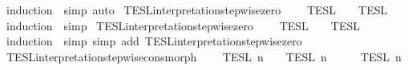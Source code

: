 \begin{isabellebody}
%
\isadelimproof
%
\endisadelimproof
%
\isatagproof
{}\isamarkupfalse%
\ {\isacharparenleft}induction\ {\isasymPhi}{\isacharcomma}\ simp{\isacharcomma}\ auto{\isacharparenright}%
\endisatagproof
{\isafoldproof}%
%
\isadelimproof
\isanewline
%
\endisadelimproof
\isanewline
{}\isamarkupfalse%
\ TESL{\isacharunderscore}interpretation{\isacharunderscore}stepwise{\isacharunderscore}zero{\isacharcolon}\isanewline
\ \ {\isacartoucheopen}{\isasymlbrakk}\ {\isasymphi}\ {\isasymrbrakk}\isactrlsub T\isactrlsub E\isactrlsub S\isactrlsub L\ {\isacharequal}\ {\isasymlbrakk}\ {\isasymphi}\ {\isasymrbrakk}\isactrlsub T\isactrlsub E\isactrlsub S\isactrlsub L\isactrlbsup {\isasymge}\ {}\isactrlesup {\isacartoucheclose}\isanewline
%
\isadelimproof
%
\endisadelimproof
%
\isatagproof
{}\isamarkupfalse%
\ {\isacharparenleft}induction\ {\isasymphi}{\isacharcomma}\ simp{\isacharplus}{\isacharparenright}%
\endisatagproof
{\isafoldproof}%
%
\isadelimproof
\isanewline
%
\endisadelimproof
\isanewline
{}\isamarkupfalse%
\ TESL{\isacharunderscore}interpretation{\isacharunderscore}stepwise{\isacharunderscore}zero{\isacharprime}{\isacharcolon}\isanewline
\ \ {\isacartoucheopen}{\isasymlbrakk}{\isasymlbrakk}\ {\isasymPhi}\ {\isasymrbrakk}{\isasymrbrakk}\isactrlsub T\isactrlsub E\isactrlsub S\isactrlsub L\ {\isacharequal}\ {\isasymlbrakk}{\isasymlbrakk}\ {\isasymPhi}\ {\isasymrbrakk}{\isasymrbrakk}\isactrlsub T\isactrlsub E\isactrlsub S\isactrlsub L\isactrlbsup {\isasymge}\ {}\isactrlesup {\isacartoucheclose}\isanewline
%
\isadelimproof
%
\endisadelimproof
%
\isatagproof
{}\isamarkupfalse%
\ {\isacharparenleft}induction\ {\isasymPhi}{\isacharcomma}\ simp{\isacharcomma}\ simp\ add{\isacharcolon}\ TESL{\isacharunderscore}interpretation{\isacharunderscore}stepwise{\isacharunderscore}zero{\isacharparenright}%
\endisatagproof
{\isafoldproof}%
%
\isadelimproof
\isanewline
%
\endisadelimproof
\isanewline
{}\isamarkupfalse%
\ TESL{\isacharunderscore}interpretation{\isacharunderscore}stepwise{\isacharunderscore}cons{\isacharunderscore}morph{\isacharcolon}\isanewline
\ \ {\isacartoucheopen}{\isasymlbrakk}\ {\isasymphi}\ {\isasymrbrakk}\isactrlsub T\isactrlsub E\isactrlsub S\isactrlsub L\isactrlbsup {\isasymge}\ n\isactrlesup \ {\isasyminter}\ {\isasymlbrakk}{\isasymlbrakk}\ {\isasymPhi}\ {\isasymrbrakk}{\isasymrbrakk}\isactrlsub T\isactrlsub E\isactrlsub S\isactrlsub L\isactrlbsup {\isasymge}\ n\isactrlesup \ {\isacharequal}\ {\isasymlbrakk}{\isasymlbrakk}\ {\isasymphi}\ {\isacharhash}\ {\isasymPhi}\ {\isasymrbrakk}{\isasymrbrakk}\isactrlsub T\isactrlsub E\isactrlsub S\isactrlsub L\isactrlbsup {\isasymge}\ n\isactrlesup {\isacartoucheclose}\isanewline

\end{isabellebody}
